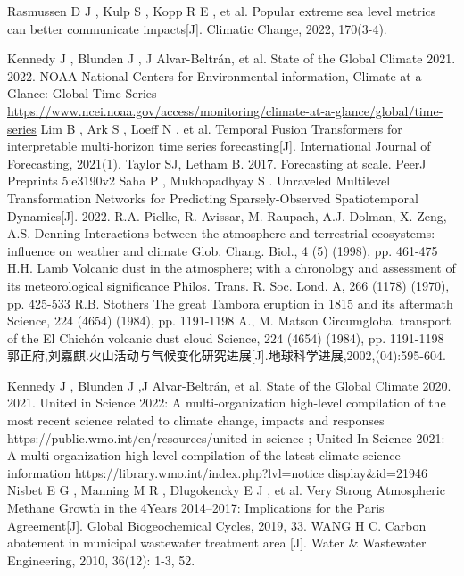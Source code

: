 \documentclass{apmcmthesis}
\begin{document}
\newpage
\begin{thebibliography}{9}%
 Rasmussen D J ,  Kulp S ,  Kopp R E , et al. Popular extreme sea level metrics can better communicate impacts[J]. Climatic Change, 2022, 170(3-4).

  Kennedy J , Blunden J , J Alvar-Beltrán, et al. State of the Global Climate 2021. 2022.
 NOAA National Centers for Environmental information, Climate at a Glance: Global Time Series \url{https://www.ncei.noaa.gov/access/monitoring/climate-at-a-glance/global/time-series}
 Lim B , Ark S , Loeff N , et al. Temporal Fusion Transformers for interpretable multi-horizon time series forecasting[J]. International Journal of Forecasting, 2021(1).
 Taylor SJ, Letham B. 2017. Forecasting at scale. PeerJ Preprints 5:e3190v2
 Saha P , Mukhopadhyay S . Unraveled Multilevel Transformation Networks for Predicting Sparsely-Observed Spatiotemporal Dynamics[J]. 2022.
 R.A. Pielke, R. Avissar, M. Raupach, A.J. Dolman, X. Zeng, A.S. Denning Interactions between the atmosphere and terrestrial ecosystems: influence on weather and climate Glob. Chang. Biol., 4 (5) (1998), pp. 461-475
H.H. Lamb Volcanic dust in the atmosphere; with a chronology and assessment of its meteorological significance Philos. Trans. R. Soc. Lond. A, 266 (1178) (1970), pp. 425-533
R.B. Stothers The great Tambora eruption in 1815 and its aftermath Science, 224 (4654) (1984), pp. 1191-1198
A., M. Matson Circumglobal transport of the El Chichón volcanic dust cloud
Science, 224 (4654) (1984), pp. 1191-1198
郭正府,刘嘉麒.火山活动与气候变化研究进展[J].地球科学进展,2002,(04):595-604.



 Kennedy J , Blunden J ,J Alvar-Beltrán, et al. State of the Global Climate 2020.  2021.
United in Science 2022: A multi-organization high-level compilation of the most recent science related to climate change, impacts and responses https://public.wmo.int/en/resources/united in science ; 
United In Science 2021: A multi-organization high-level compilation of the latest climate science information    https://library.wmo.int/index.php?lvl=notice display\&id=21946
 Nisbet E G ,  Manning M R ,  Dlugokencky E J , et al. Very Strong Atmospheric Methane Growth in the 4Years 2014–2017: Implications for the Paris Agreement[J].  Global Biogeochemical Cycles, 2019, 33.
WANG H C. Carbon abatement in municipal wastewater treatment area
[J]. Water \& Wastewater Engineering, 2010, 36(12): 1-3, 52.


\end{thebibliography}
\end{document}
